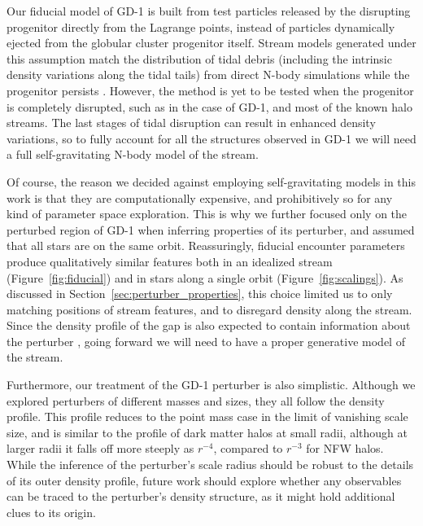 \documentclass[twocolumn]{aastex62}
\begin{document}
Our fiducial model of GD-1 is built from test particles released by the disrupting progenitor directly from the Lagrange points, instead of particles dynamically ejected from the globular cluster progenitor itself.
Stream models generated under this assumption match the distribution of tidal debris (including the intrinsic density variations along the tidal tails) from direct N-body simulations while the progenitor persists \citep[e.g.,][]{kupper2012,fardal2015}.
However, the method is yet to be tested when the progenitor is completely disrupted, such as in the case of GD-1, and most of the known halo streams.
The last stages of tidal disruption can result in enhanced density variations, so to fully account for all the structures observed in GD-1 we will need a full self-gravitating N-body model of the stream.

Of course, the reason we decided against employing self-gravitating models in this work is that they are computationally expensive, and prohibitively so for any kind of parameter space exploration.
This is why we further focused only on the perturbed region of GD-1 when inferring properties of its perturber, and assumed that all stars are on the same orbit.
Reassuringly, fiducial encounter parameters produce qualitatively similar features both in an idealized stream (Figure~\ref{fig:fiducial}) and in stars along a single orbit (Figure~\ref{fig:scalings}).
As discussed in Section~\ref{sec:perturber_properties}, this choice limited us to only matching positions of stream features, and to disregard density along the stream.
Since the density profile of the gap is also expected to contain information about the perturber \citep{eb2015b}, going forward we will need to have a proper generative model of the stream.

Furthermore, our treatment of the GD-1 perturber is also simplistic.
Although we explored perturbers of different masses and sizes, they all follow the \citet{hernquist1990} density profile.
This profile reduces to the point mass case in the limit of vanishing scale size, and is similar to the profile of dark matter halos \citep[NFW,][]{navarro1997} at small radii, although at larger radii it falls off more steeply as $r^{-4}$, compared to $r^{-3}$ for NFW halos.
While the inference of the perturber's scale radius should be robust to the details of its outer density profile, future work should explore whether any observables can be traced to the perturber's density structure, as it might hold additional clues to its origin.
\end{document}
